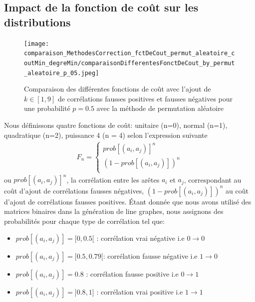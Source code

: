 \documentclass[onecolumn, 12pt]{book}
\begin{document}
\subsection{Impact de la fonction de co\^ut sur les distributions}
\label{fonctionDeCout}
\begin{centering} 
\begin{figure}[htb!] 
\texttt{[image: comparaison\_MethodesCorrection\_fctDeCout\_permut\_aleatoire\_coutMin\_degreMin/comparaisonDifferentesFonctDeCout\_by\_permut\_aleatoire\_p\_05.jpeg]}
\caption{ Comparaison des diff\'erentes fonctions de co\^ut avec l'ajout de $k \in [1,9]$ de corr\'elations fausses positives et fausses n\'egatives pour une probabilit\'e $p = 0.5$ avec la m\'ethode de permutation al\'eatoire }
\label{compareDifferentesFonctionDeCout_p05} 
\end{figure}
\end{centering} 
Nous d\'efinissons quatre fonctions de co\^ut: unitaire (n=0), normal (n=1), quadratique (n=2), puissance 4 (n = 4) selon l'expression suivante
\begin{equation}
	\begin{aligned}
	F_n = 
	\begin{cases}
		prob[(a_i,a_j)]^n   \\
		(1 - prob[(a_i,a_j)])^n \\
	\end{cases}
	\end{aligned}
\end{equation}
ou $prob[(a_i,a_j)]^n$, la corr\'elation entre les ar\^etes $a_i$ et $a_j$, correspondant au co\^ut d'ajout de corr\'elations fausses n\'egatives, 
$(1-prob[(a_i,a_j)])^n$ au co\^ut d'ajout de corr\'elations fausses positives.
\newline
\'Etant donn\'ee que nous avons utilis\'e des matrices binaires dans la g\'en\'eration de line graphes, nous assignons des probabilit\'es pour chaque type de corr\'elation tel que:
\begin{itemize}
\item $prob[(a_i,a_j)] = [0, 0.5[ $ : corr\'elation vrai n\'egative i.e $0 \rightarrow 0$
\item $prob[(a_i,a_j)] = [0.5, 0.79[ $: corr\'elation fausse n\'egative i.e $1 \rightarrow 0$
\item $prob[(a_i,a_j)] = 0.8 $ : corr\'elation fausse positive i.e $0 \rightarrow 1$
\item $prob[(a_i,a_j)] = ]0.8, 1] $ : corr\'elation vrai positive i.e $1 \rightarrow 1$
\end{itemize}
\end{document}
